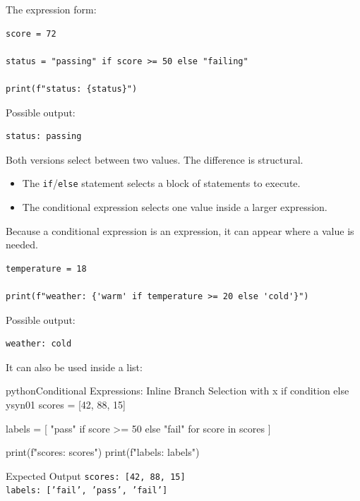 The expression form:

\begin{verbatim}
score = 72

status = "passing" if score >= 50 else "failing"

print(f"status: {status}")
\end{verbatim}

Possible output:

\begin{verbatim}
status: passing
\end{verbatim}

Both versions select between two values. The difference is structural.

\begin{itemize}
    \item The \texttt{if}/\texttt{else} statement selects a block of statements to execute.
    \item The conditional expression selects one value inside a larger expression.
\end{itemize}

Because a conditional expression is an expression, it can appear where a value is needed.

\begin{verbatim}
temperature = 18

print(f"weather: {'warm' if temperature >= 20 else 'cold'}")
\end{verbatim}

Possible output:

\begin{verbatim}
weather: cold
\end{verbatim}

It can also be used inside a list:

\begin{codebox}[]{python}{Conditional Expressions: Inline Branch Selection with x if condition else y}{syn01}
scores = [42, 88, 15]

labels = [
    "pass" if score >= 50 else "fail"
    for score in scores
]

print(f"scores: {scores}")
print(f"labels: {labels}")
\end{codebox}


\begin{iobox}{Expected Output}
\texttt{scores: [42, 88, 15]} \\
\texttt{labels: ['fail', 'pass', 'fail']} \\
\end{iobox}


